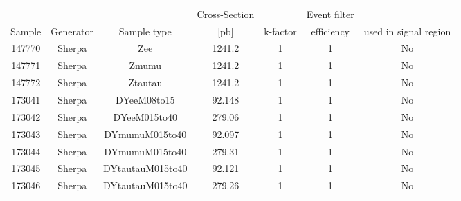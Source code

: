 \begin{table}[ht!]
  \centering
  \begin{footnotesize}
  
\begin{tabular}{c|c|c|c|c|c|c}
\hline
    &  &  & Cross-Section &  & Event filter  \\
  Sample  & Generator & Sample type & [pb] & k-factor &  efficiency  & used in signal region\\
\hline \hline
147770 & Sherpa & Zee  				&  1241.2  &  1  & 1 & No \\
147771 & Sherpa & Zmumu  			&  1241.2  &  1  & 1 & No \\
147772 & Sherpa & Ztautau  			&  1241.2  &  1  & 1 & No \\
173041 & Sherpa & DYeeM08to15 		& 92.148	& 1  & 1 & No \\
173042 & Sherpa & DYeeM015to40 		& 279.06	& 1  & 1 & No \\
173043 & Sherpa & DYmumuM015to40 	& 	92.097  & 1  & 1 & No \\
173044 & Sherpa & DYmumuM015to40 	& 	279.31  & 1  & 1 & No \\
173045 & Sherpa & DYtautauM015to40 	& 92.121	& 1  & 1 & No \\
173046 & Sherpa & DYtautauM015to40 	& 279.26	& 1  & 1 & No \\


\end{tabular}
\end{footnotesize}
\end{table}
